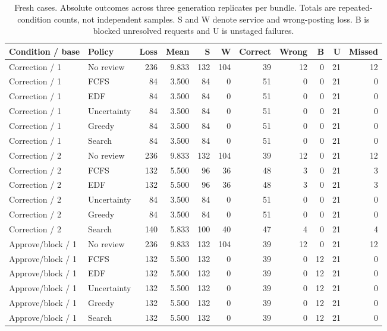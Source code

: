 \begin{table}[t]
\caption{Fresh cases. Absolute outcomes across three generation replicates per bundle. Totals are repeated-condition counts, not independent samples. S and W denote service and wrong-posting loss. B is blocked unresolved requests and U is unstaged failures.}
\centering\small
\begin{tabular}{llrrrrrrrrr}
\toprule
Condition / base & Policy & Loss & Mean & S & W & Correct & Wrong & B & U & Missed \\
\midrule
Correction / 1 & No review & 236 & 9.833 & 132 & 104 & 39 & 12 & 0 & 21 & 12 \\
Correction / 1 & FCFS & 84 & 3.500 & 84 & 0 & 51 & 0 & 0 & 21 & 0 \\
Correction / 1 & EDF & 84 & 3.500 & 84 & 0 & 51 & 0 & 0 & 21 & 0 \\
Correction / 1 & Uncertainty & 84 & 3.500 & 84 & 0 & 51 & 0 & 0 & 21 & 0 \\
Correction / 1 & Greedy & 84 & 3.500 & 84 & 0 & 51 & 0 & 0 & 21 & 0 \\
Correction / 1 & Search & 84 & 3.500 & 84 & 0 & 51 & 0 & 0 & 21 & 0 \\
Correction / 2 & No review & 236 & 9.833 & 132 & 104 & 39 & 12 & 0 & 21 & 12 \\
Correction / 2 & FCFS & 132 & 5.500 & 96 & 36 & 48 & 3 & 0 & 21 & 3 \\
Correction / 2 & EDF & 132 & 5.500 & 96 & 36 & 48 & 3 & 0 & 21 & 3 \\
Correction / 2 & Uncertainty & 84 & 3.500 & 84 & 0 & 51 & 0 & 0 & 21 & 0 \\
Correction / 2 & Greedy & 84 & 3.500 & 84 & 0 & 51 & 0 & 0 & 21 & 0 \\
Correction / 2 & Search & 140 & 5.833 & 100 & 40 & 47 & 4 & 0 & 21 & 4 \\
Approve/block / 1 & No review & 236 & 9.833 & 132 & 104 & 39 & 12 & 0 & 21 & 12 \\
Approve/block / 1 & FCFS & 132 & 5.500 & 132 & 0 & 39 & 0 & 12 & 21 & 0 \\
Approve/block / 1 & EDF & 132 & 5.500 & 132 & 0 & 39 & 0 & 12 & 21 & 0 \\
Approve/block / 1 & Uncertainty & 132 & 5.500 & 132 & 0 & 39 & 0 & 12 & 21 & 0 \\
Approve/block / 1 & Greedy & 132 & 5.500 & 132 & 0 & 39 & 0 & 12 & 21 & 0 \\
Approve/block / 1 & Search & 132 & 5.500 & 132 & 0 & 39 & 0 & 12 & 21 & 0 \\

\end{tabular}
\end{table}

